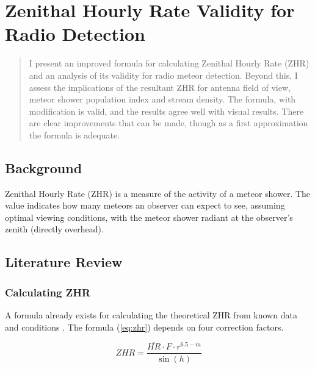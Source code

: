 \chapter{Zenithal Hourly Rate Validity for Radio Detection} \label{chap:zhr}
\begin{strip} 
	\begin{minipage}{\textwidth} 
		\begin{abstract} 
	I present an improved formula for calculating Zenithal Hourly Rate (ZHR) and
	an analysis of its validity for radio meteor detection. Beyond this, I
	assess the implications of the resultant ZHR for antenna field of view,
	meteor shower population index and stream density. The formula, with
	modification is valid, and the results agree well with visual results. There
	are clear improvements that can be made, though as a first approximation the
	formula is adequate.  
		\end{abstract} 
	\end{minipage}
\end{strip}

\section{Background} Zenithal Hourly Rate (ZHR) is a measure of the activity of
a meteor shower. The value indicates how many meteors an observer can expect to
see, assuming optimal viewing conditions, with the meteor shower radiant at the
observer's zenith (directly overhead).

\section{Literature Review}

\subsection{Calculating ZHR} A formula already exists for calculating the
theoretical ZHR from known data and conditions \cite{zhr}. The formula
(\ref{eq:zhr}) depends on four correction factors.

\begin{equation}{ZHR} = \frac{\overline{HR} \cdot F \cdot r^{6.5-{m}}}{\sin
\left( h \right)}\label{eq:zhr} \end{equation}

